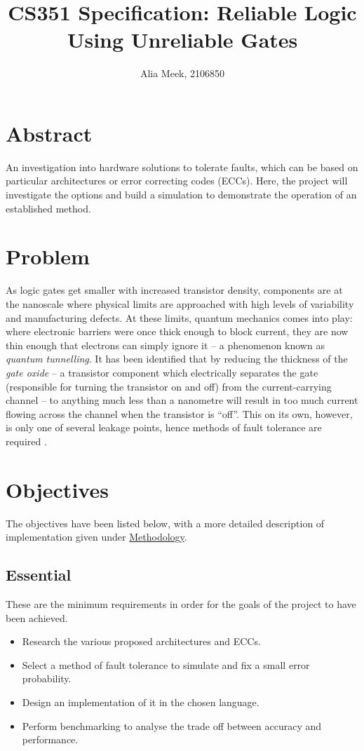 \documentclass[12pt,a4paper]{article}
\title{CS351 Specification: Reliable Logic Using Unreliable Gates}
\author{Alia Meek, 2106850}
\date{}
\begin{document}
\maketitle


\section{Abstract}
An investigation into hardware solutions to tolerate faults, which can be based on particular architectures or error 
correcting codes (ECCs). Here, the project will investigate the options and build a simulation to demonstrate the 
operation of an established method.


\section{Problem}
As logic gates get smaller with increased transistor density, components are at the nanoscale where physical limits 
are approached with high levels of variability and manufacturing defects. At these limits, quantum mechanics comes 
into play: where electronic barriers were once thick enough to block current, they are now thin enough that electrons 
can simply ignore it -- a phenomenon known as \emph{quantum tunnelling}. It has been identified that by reducing the 
thickness of the \emph{gate oxide} -- a transistor component which electrically separates the gate (responsible for 
turning the transistor on and off) from the current-carrying channel -- to anything much less than a nanometre will 
result in too much current flowing across the channel when the transistor is “off”. This on its own, however, is 
only one of several leakage points, hence methods of fault tolerance are required \cite{ref1}.


\section{Objectives}
The objectives have been listed below, with a more detailed description of implementation given under 
\hyperref[sec:meth]{Methodology}.

\subsection{Essential}
These are the minimum requirements in order for the goals of the project to have been achieved.
\begin{itemize}
    \item Research the various proposed architectures and ECCs.
    \item Select a method of fault tolerance to simulate and fix a small error probability.
    \item Design an implementation of it in the chosen language.
    \item Perform benchmarking to analyse the trade off between accuracy and performance.
\end{itemize}
\end{document}
